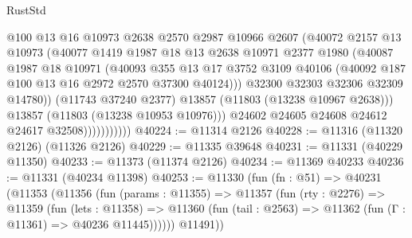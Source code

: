\begin{lexlean}{RustStd}
\begin{coremodule}
                              @100
                              @13
                              @16
                              @10973
                              @2638
                              @2570
                              @2987
                              @10966
                              @2607
                              (@40072
                                @2157
                                @13
                                @10973
                                (@40077
                                  @1419
                                  @1987
                                  @18
                                  @13
                                  @2638
                                  @10971
                                  @2377
                                  @1980
                                  (@40087
                                    @1987
                                    @18
                                    @10971
                                    (@40093
                                      @355
                                      @13
                                      @17
                                      @3752
                                      @3109
                                      @40106
                                      (@40092 @187 @100 @13 @16 @2972 @2570 @37300 @40124)))
                                  @32300
                                  @32303
                                  @32306
                                  @32309
                                  @14780))
                              (@11743 @37240 @2377)
                              @13857
                              (@11803 (@13238 @10967 @2638)))
                            @13857
                            (@11803 (@13238 @10953 @10976)))
                          @24602
                          @24605
                          @24608
                          @24612
                          @24617
                          @32508)))))))))))
@40224 := @11314 @2126
@40228 := @11316 (@11320 @2126) (@11326 @2126)
@40229 := @11335 @39648
@40231 := @11331 (@40229 @11350)
@40233 := @11373 (@11374 @2126)
@40234 := @11369 @40233
@40236 := @11331 (@40234 @11398)
@40253 := @11330
    (fun (fn : @51) =>
    @40231
      (@11353
        (@11356
          (fun (params : @11355) =>
          @11357
            (fun (rty : @2276) =>
            @11359
              (fun (lets : @11358) =>
              @11360 (fun (tail : @2563) => @11362 (fun (Γ : @11361) => @40236 @11445))))))
        @11491))

\end{coremodule}
\end{lexlean}
